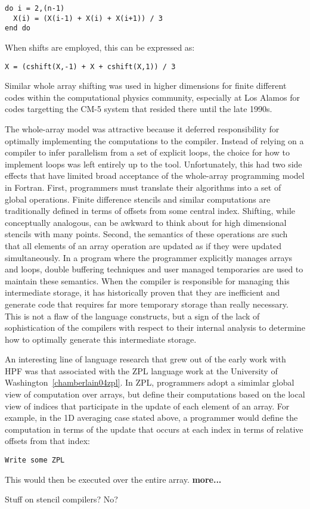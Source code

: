 {\small
\begin{verbatim}
do i = 2,(n-1)
  X(i) = (X(i-1) + X(i) + X(i+1)) / 3
end do
\end{verbatim}
}

When shifts are employed, this can be expressed as:

{\small
\begin{verbatim}
X = (cshift(X,-1) + X + cshift(X,1)) / 3
\end{verbatim}
}

Similar whole array shifting was used in higher dimensions for finite
different codes within the computational physics community, especially
at Los Alamos for codes targetting the CM-5 system that resided there until the
late 1990s.  

The whole-array model was attractive because it deferred
responsibility for optimally implementing the computations to the
compiler.  Instead of relying on a compiler to infer parallelism from
a set of explicit loops, the choice for how to implement loops was
left entirely up to the tool.  Unfortunately, this had two side
effects that have limited broad acceptance of the whole-array
programming model in Fortran.  First, programmers must translate their
algorithms into a set of global operations.  Finite difference
stencils and similar computations are traditionally defined in terms
of offsets from some central index.  Shifting, while conceptually
analogous, can be awkward to think about for high dimensional stencils
with many points.  Second, the semantics of these operations are such
that all elements of an array operation are updated as if they were
updated simultaneously.  In a program where the programmer explicitly
manages arrays and loops, double buffering techniques and user managed
temporaries are used to maintain these semantics.  When the compiler
is responsible for managing this intermediate storage, it has
historically proven that they are inefficient and generate code that
requires far more temporary storage than really necessary.  This is
not a flaw of the language constructs, but a sign of the lack of
sophistication of the compilers with respect to their internal
analysis to determine how to optimally generate this intermediate
storage.

An interesting line of language research that grew out of the early work
with HPF was that associated with the ZPL language work at the University
of Washington~\ref{chamberlain04zpl}.  In ZPL, programmers adopt a simimlar
global view of computation over arrays, but define their computations based
on the local view of indices that participate in the update of each element of
an array.  For example, in the 1D averaging case stated above, a programmer would
define the computation in terms of the update that occurs at each index in terms
of relative offsets from that index:

\begin{verbatim}
Write some ZPL
\end{verbatim}

This would then be executed over the entire array. {\bf more...}

Stuff on stencil compilers?  No?
